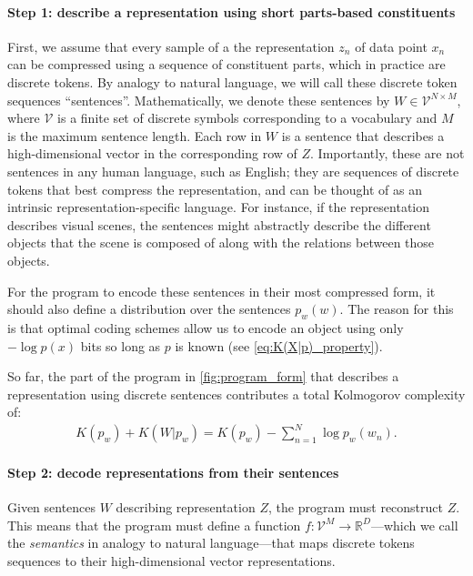 \documentclass{article} %
\begin{document}
\paragraph{Step 1: describe a representation using short parts-based constituents}

First, we assume that every sample of a the representation $z_n$ of data point $x_n$ can be compressed using a sequence of constituent parts, which in practice are discrete tokens. By analogy to natural language, we will call these discrete token sequences ``sentences''. Mathematically, we denote these sentences by $W \in \mathcal{V}^{N \times M}$, where $\mathcal{V}$ is a finite set of discrete symbols corresponding to a vocabulary and $M$ is the maximum sentence length. Each row in $W$ is a sentence that describes a high-dimensional vector in the corresponding row of $Z$. Importantly, these are not sentences in any human language, such as English; they are sequences of discrete tokens that best compress the representation, and can be thought of as an intrinsic representation-specific language. For instance, if the representation describes visual scenes, the sentences might abstractly describe the different objects that the scene is composed of along with the relations between those objects.

For the program to encode these sentences in their most compressed form, it should also define a distribution over the sentences $p_w(w)$. The reason for this is that optimal coding schemes \citep[e.g., arithmetic coding][]{witten1987arithmetic} allow us to encode an object using only $-\log p(x)$ bits so long as $p$ is known (see \cref{eq:K(X|p)_property}).

So far, the part of the program in \cref{fig:program_form} that describes a representation using discrete sentences contributes a total Kolmogorov complexity of:
\begin{align*}
     K(p_w) + K(W|p_w) = K(p_w) - \sum_{n=1}^N \log p_w(w_n) .
\end{align*}

\paragraph{Step 2: decode representations from their sentences}

Given sentences $W$ describing representation $Z$, the program must reconstruct $Z$. This means that the program must define a function $f: \mathcal{V}^M \rightarrow \mathbb{R}^D$---which we call the \textit{semantics} in analogy to natural language---that maps discrete tokens sequences to their high-dimensional vector representations.
\end{document}
